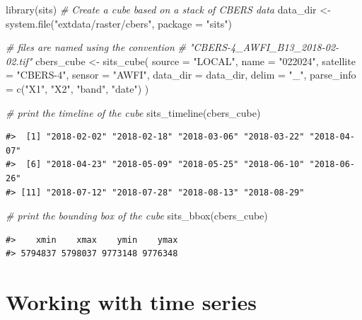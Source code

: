 \documentclass[a4paper,]{tufte-book}
\newenvironment{Shaded}{}{}
\newcommand{\AttributeTok}[1]{\textcolor[rgb]{0.49,0.56,0.16}{#1}}
\newcommand{\CommentTok}[1]{\textcolor[rgb]{0.38,0.63,0.69}{\textit{#1}}}
\newcommand{\FunctionTok}[1]{\textcolor[rgb]{0.02,0.16,0.49}{#1}}
\newcommand{\NormalTok}[1]{#1}
\newcommand{\OtherTok}[1]{\textcolor[rgb]{0.00,0.44,0.13}{#1}}
\newcommand{\StringTok}[1]{\textcolor[rgb]{0.25,0.44,0.63}{#1}}
\begin{document}
\begin{Shaded}
\begin{Highlighting}[]
\FunctionTok{library}\NormalTok{(sits)}
\CommentTok{\# Create a cube based on a stack of CBERS data}
\NormalTok{data\_dir }\OtherTok{\textless{}{-}} \FunctionTok{system.file}\NormalTok{(}\StringTok{"extdata/raster/cbers"}\NormalTok{, }\AttributeTok{package =} \StringTok{"sits"}\NormalTok{)}

\CommentTok{\# files are named using the convention }
\CommentTok{\# "CBERS{-}4\_AWFI\_B13\_2018{-}02{-}02.tif"}
\NormalTok{cbers\_cube }\OtherTok{\textless{}{-}} \FunctionTok{sits\_cube}\NormalTok{(}
      \AttributeTok{source =} \StringTok{"LOCAL"}\NormalTok{,}
      \AttributeTok{name =} \StringTok{"022024"}\NormalTok{,}
      \AttributeTok{satellite =} \StringTok{"CBERS{-}4"}\NormalTok{,}
      \AttributeTok{sensor =} \StringTok{"AWFI"}\NormalTok{,}
      \AttributeTok{data\_dir =}\NormalTok{ data\_dir,}
      \AttributeTok{delim =} \StringTok{"\_"}\NormalTok{,}
      \AttributeTok{parse\_info =} \FunctionTok{c}\NormalTok{(}\StringTok{"X1"}\NormalTok{, }\StringTok{"X2"}\NormalTok{, }\StringTok{"band"}\NormalTok{, }\StringTok{"date"}\NormalTok{)}
\NormalTok{)}

\CommentTok{\# print the timeline of the cube}
\FunctionTok{sits\_timeline}\NormalTok{(cbers\_cube)}
\end{Highlighting}
\end{Shaded}

\begin{verbatim}
#>  [1] "2018-02-02" "2018-02-18" "2018-03-06" "2018-03-22" "2018-04-07"
#>  [6] "2018-04-23" "2018-05-09" "2018-05-25" "2018-06-10" "2018-06-26"
#> [11] "2018-07-12" "2018-07-28" "2018-08-13" "2018-08-29"
\end{verbatim}

\begin{Shaded}
\begin{Highlighting}[]
\CommentTok{\# print the bounding box of the cube}
\FunctionTok{sits\_bbox}\NormalTok{(cbers\_cube)}
\end{Highlighting}
\end{Shaded}

\begin{verbatim}
#>    xmin    xmax    ymin    ymax 
#> 5794837 5798037 9773148 9776348
\end{verbatim}

\hypertarget{working-with-time-series}{%
\chapter{Working with time series}\label{working-with-time-series}}
\end{document}
